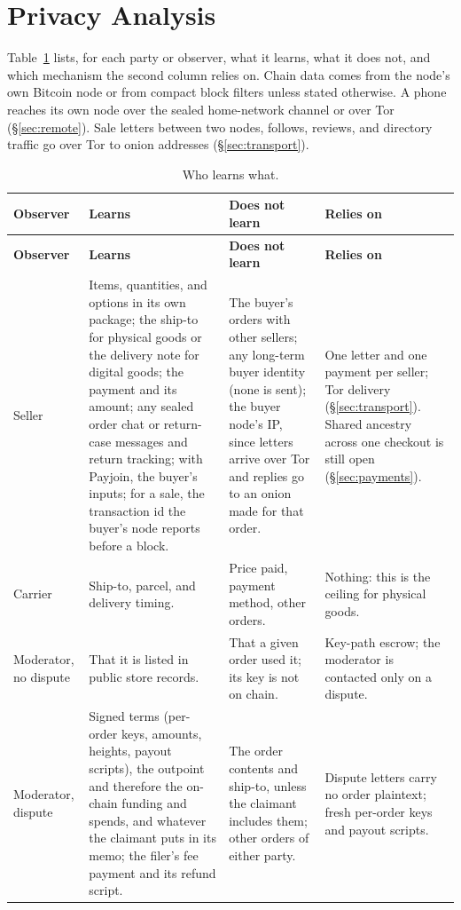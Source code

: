 \section{Privacy Analysis}
\label{sec:privacy}

Table~\ref{tab:learns} lists, for each party or observer, what it learns, what it does not, and which mechanism the second column relies on. Chain data comes from the node's own Bitcoin node or from compact block filters unless stated otherwise. A phone reaches its own node over the sealed home-network channel or over Tor (\S\ref{sec:remote}). Sale letters between two nodes, follows, reviews, and directory traffic go over Tor to onion addresses (\S\ref{sec:transport}).

{\small
\setlength{\tabcolsep}{4pt}
\renewcommand{\arraystretch}{1.15}
\begin{longtable}{@{}p{}p{}p{}p{}@{}}
\caption{Who learns what.}\label{tab:learns}\\
\toprule
\textbf{Observer} & \textbf{Learns} & \textbf{Does not learn} & \textbf{Relies on} \\
\midrule
\endfirsthead
\toprule
\textbf{Observer} & \textbf{Learns} & \textbf{Does not learn} & \textbf{Relies on} \\
\midrule
\endhead
\bottomrule
\endfoot
Seller & Items, quantities, and options in its own package; the ship-to for physical goods or the delivery note for digital goods; the payment and its amount; any sealed order chat or return-case messages and return tracking; with Payjoin, the buyer's inputs; for a sale, the transaction id the buyer's node reports before a block. & The buyer's orders with other sellers; any long-term buyer identity (none is sent); the buyer node's IP, since letters arrive over Tor and replies go to an onion made for that order. & One letter and one payment per seller; Tor delivery (\S\ref{sec:transport}). Shared ancestry across one checkout is still open (\S\ref{sec:payments}). \\
Carrier & Ship-to, parcel, and delivery timing. & Price paid, payment method, other orders. & Nothing: this is the ceiling for physical goods. \\
Moderator, no dispute & That it is listed in public store records. & That a given order used it; its key is not on chain. & Key-path escrow; the moderator is contacted only on a dispute. \\
Moderator, dispute & Signed terms (per-order keys, amounts, heights, payout scripts), the outpoint and therefore the on-chain funding and spends, and whatever the claimant puts in its memo; the filer's fee payment and its refund script. & The order contents and ship-to, unless the claimant includes them; other orders of either party. & Dispute letters carry no order plaintext; fresh per-order keys and payout scripts. \\

\end{longtable}}
